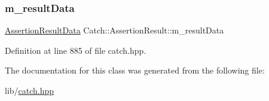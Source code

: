\subsubsection{\texorpdfstring{m\+\_\+result\+Data}{m\_resultData}}
{\footnotesize\ttfamily \hyperlink{struct_catch_1_1_assertion_result_data}{Assertion\+Result\+Data} Catch\+::\+Assertion\+Result\+::m\+\_\+result\+Data\hspace{0.3cm}{\ttfamily [protected]}}



Definition at line 885 of file catch.\+hpp.



The documentation for this class was generated from the following file\+:\begin{DoxyCompactItemize}
\item 
lib/\hyperlink{catch_8hpp}{catch.\+hpp}\end{DoxyCompactItemize}
